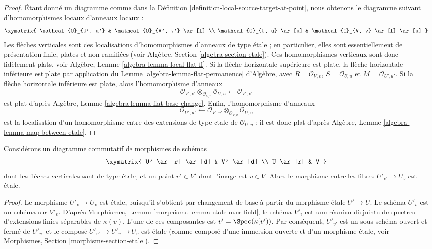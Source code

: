 \begin{proof}
Étant donné un diagramme comme dans la
Définition \ref{definition-local-source-target-at-point}, nous obtenons le
diagramme suivant d'homomorphismes locaux d'anneaux locaux :
$$
\xymatrix{
\mathcal{O}_{U', u'} & \mathcal{O}_{V', v'} \ar[l] \\
\mathcal{O}_{U, u} \ar[u] & \mathcal{O}_{V, v} \ar[l] \ar[u]
}
$$
Les flèches verticales sont des localisations d'homomorphismes d'anneaux
de type \'etale ; en particulier, elles sont essentiellement de présentation finie,
plates et non ramifiées (voir
Algèbre, Section \ref{algebra-section-etale}).
Ces homomorphismes verticaux sont donc fidèlement plats, voir
Algèbre, Lemme \ref{algebra-lemma-local-flat-ff}.
Si la flèche horizontale supérieure est plate, la flèche horizontale
inférieure est plate par application du
Lemme \ref{algebra-lemma-flat-permanence} d'Algèbre,
avec $R = \mathcal{O}_{V, v}$, $S = \mathcal{O}_{U, u}$ et
$M = \mathcal{O}_{U', u'}$. Si la flèche horizontale inférieure est
plate, alors l'homomorphisme d'anneaux
$$
\mathcal{O}_{V', v'} \otimes_{\mathcal{O}_{V, v}} \mathcal{O}_{U, u}
\longleftarrow
\mathcal{O}_{V', v'}
$$
est plat d'après
Algèbre, Lemme \ref{algebra-lemma-flat-base-change}.
Enfin, l'homomorphisme d'anneaux
$$
\mathcal{O}_{U', u'}
\longleftarrow
\mathcal{O}_{V', v'} \otimes_{\mathcal{O}_{V, v}} \mathcal{O}_{U, u}
$$
est la localisation d'un homomorphisme entre des extensions de type \'etale de
$\mathcal{O}_{U, u}$ ; il est donc plat d'après
Algèbre, Lemme \ref{algebra-lemma-map-between-etale}.
\end{proof}

\begin{lemma}
\label{lemma-etale-on-fiber}
Considérons un diagramme commutatif de morphismes de schémas
$$
\xymatrix{
U' \ar[r] \ar[d] & V' \ar[d] \\
U \ar[r] & V
}
$$
dont les flèches verticales sont de type \'etale, et un point $v' \in V'$
dont l'image est $v \in V$. Alors le morphisme entre les fibres
$U'_{v'} \to U_v$ est \'etale.
\end{lemma}

\begin{proof}
Le morphisme $U'_v \to U_v$ est \'etale, puisqu'il s'obtient par
changement de base à partir du morphisme \'etale $U' \to U$.
Le schéma $U'_v$ est un schéma sur $V'_v$. D'après
Morphismes, Lemme \ref{morphisms-lemma-etale-over-field}, le schéma
$V'_v$ est une réunion disjointe de spectres d'extensions finies séparables
de $\kappa(v)$. L'une de ces composantes est
$v' = \Spec(\kappa(v'))$. Par conséquent, $U'_{v'}$ est un sous-schéma
ouvert et fermé de $U'_v$, et le composé
$U'_{v'} \to U'_v \to U_v$ est \'etale (comme composé d'une immersion
ouverte et d'un morphisme \'etale, voir
Morphismes, Section \ref{morphisms-section-etale}).
\end{proof}

